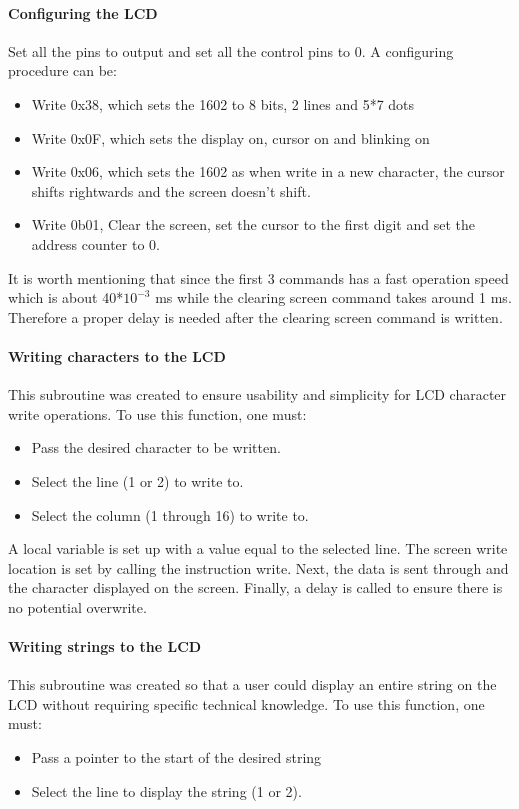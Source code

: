 \documentclass[]{report}
\begin{document}
\paragraph{Configuring the LCD}
Set all the pins to output and set all the control pins to 0. A configuring procedure can be:
\begin{itemize}
	\item Write 0x38, which sets the 1602 to 8 bits, 2 lines and 5*7 dots
	\item Write 0x0F, which sets the display on, cursor on and blinking on
	\item Write 0x06, which sets the 1602 as when write in a new character, the cursor shifts rightwards and the screen doesn't shift.
	\item Write 0b01, Clear the screen, set the cursor to the first digit and set the address counter to 0.
\end{itemize}

     It is worth mentioning that since the first 3 commands has a fast operation speed which is about 40*$10^{-3}$ ms while the clearing screen command takes around 1 ms.  Therefore a proper delay is needed after the clearing screen command is written.
     
\paragraph{Writing characters to the LCD}
This subroutine was created to ensure usability and simplicity for LCD character write operations.
To use this function, one must:
\begin{itemize}
\item Pass the desired character to be written.
\item Select the line (1 or 2) to write to.
\item Select the column (1 through 16) to write to.
\end{itemize}


A local variable is set up with a value equal to the selected line. The screen write location is set by calling the instruction write. Next, the data is sent through and the character displayed on the screen. Finally, a delay is called to ensure there is no potential overwrite.

\paragraph{Writing strings to the LCD}
This subroutine was created so that a user could display an entire string on the LCD without requiring specific technical knowledge. To use this function, one must:
\begin{itemize}
\item Pass a pointer to the start of the desired string
\item Select the line to display the string (1 or 2).
\end{itemize}
\end{document}
